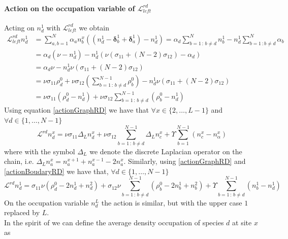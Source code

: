 \documentclass[10pt]{article}
\numberwithin{equation}{section}
\numberwithin{equation}{subsection}
\begin{document}
\paragraph{Action on the occupation variable of $\mathcal{L}_{left}^{rd}$}
Acting on $n_{d}^{1}$  with $\mathcal{L}_{left}^{rd}$ we obtain
\begin{equation}\label{actionBoudaryRD}
	\begin{split}
		\mathcal{L}_{left}^{rd}n_{d}^{1}&=\sum_{a,b=1}^{N}\alpha_{a}n_{b}^{x}\left((n_{d}^{1}-\bm{\delta}_{b}^{1}+\bm{\delta}_{a}^{1})-n_{d}^{1}\right)=\alpha_{d}\sum_{b=1\,:\,b\neq d}^{N}n_{b}^{1}-n_{d}^{1}\sum_{b=1\,:b\neq d}^{N}\alpha_{b}
		\\&=
		\alpha_{d}\left(\nu-n_{d}^{1}\right)-n_{d}^{1}\left(\nu(\sigma_{11}+(N-2)\sigma_{12})-\alpha_{d}\right)
		\\&=\alpha_{d}\nu-n_{d}^{1}\nu(\sigma_{11}+(N-2)\sigma_{12})
		\\&=
		\nu\sigma_{11}\rho_{d}^{0}+\nu\sigma_{12}\left(\sum_{b=1\,:\,b\neq d}^{N-1}\rho_{b}^{0}\right)-n_{d}^{1}\nu(\sigma_{11}+(N-2)\sigma_{12})
		\\&=
		\nu \sigma_{11} (\rho_{d}^{0}-n_{d}^{1})+\nu\sigma_{12}\sum_{b=1\,:\,b\neq d}^{N-1}(\rho_{b}^{0}-n_{d}^{1})
	\end{split}
\end{equation}
Using equation \eqref{actionGraphRD} we have that $\forall x\in \{2,\ldots,L-1\}$ and $\forall d\in\{1,\ldots,N-1\}$
\begin{equation}\label{DifferenceEquation}
	\mathcal{L}^{rd}n_{d}^{x}=\nu\sigma_{11}\Delta_{L}n_{d}^{x}+\nu\sigma_{12}\sum_{b=1\,:\,b\neq d}^{N-1}\Delta_{L}n_{c}^{x}+\Upsilon\sum_{b=1}^{N-1}(n_{c}^{x}-n_{\alpha}^{x})
\end{equation}
where with the symbol $\Delta_{L}$ we denote the discrete Laplacian operator on the chain, i.e. $\Delta_{L}n_{a}^{x}=n_{a}^{x+1}+n_{a}^{x-1}-2n_{a}^{x}$.
Similarly, using \eqref{actionGraphRD}  and \eqref{actionBoudaryRD} we have that, $\forall d\in \{1,\ldots,N-1\}$ 
\begin{equation}\label{actionBDLine}
	\mathcal{L}^{rd}n_{d}^{1}=\sigma_{11}\nu \left(\rho_{d}^{0}-2n_{d}^{1}+n_{d}^{2}\right)+\sigma_{12}\nu\sum_{b=1\,:\,b\neq d}^{N-1}\left(\rho_{b}^{0}-2n_{b}^{1}+n_{b}^{2}\right)+\Upsilon\sum_{b=1\,:\,b\neq d}^{N-1}\left(n_{b}^{1}-n_{d}^{1}\right)
\end{equation}
On the occupation variable $n_{d}^{L}$ the action is similar, but with the upper case $1$ replaced by $L$.\\ In the spirit of \cite{casini2022uphill} we can define the average density occupation of species $d$ at site $x$ as
\end{document}
